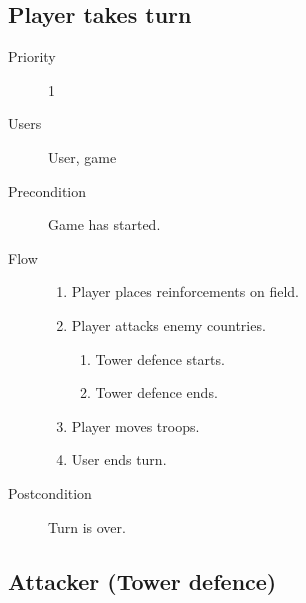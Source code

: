 \documentclass[12pt,a4paper]{article}
\begin{document}
\subsection{Player takes turn}

\begin{description}
\item[Priority] 1
\item[Users] User, game
\item[Precondition] Game has started.
\item[Flow]\mbox{}
  \begin{enumerate}
  \item Player places reinforcements on field.
  \item Player attacks enemy countries.
    \begin{enumerate}
    \item Tower defence starts.
    \item Tower defence ends.
    \end{enumerate}
  \item Player moves troops.
  \item User ends turn.
  \end{enumerate}
\item[Postcondition] Turn is over.
\end{description}

\subsection{Attacker (Tower defence)}
\end{document}
